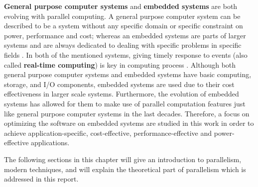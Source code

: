\textbf{General purpose computer systems} and \textbf{embedded systems} are both evolving with parallel computing. A general purpose computer system can be described to be a system without any specific domain or specific constraint on power, performance and cost; whereas an embedded systems are parts of larger systems and are always dedicated to dealing with specific problems in specific fields \cite{gpcVSes}. In both of the mentioned systems, giving timely response to events (also called \textbf{real-time computing}) is key in computing process \cite{gpcVSes}. Although both general purpose computer systems and embedded systems have basic computing, storage, and I/O components, embedded systems are used due to their cost effectiveness in larger scale systems. Furthermore, the evolution of embedded systems has allowed for them to make use of parallel computation features just like general purpose computer systems in the last decades. Therefore, a focus on optimizing the software on embedded systems are studied in this work in order to achieve application-specific, cost-effective, performance-effective and power-effective applications.

The following sections in this chapter will give an introduction to parallelism, modern techniques, and will explain the theoretical part of parallelism which is addressed in this report.
